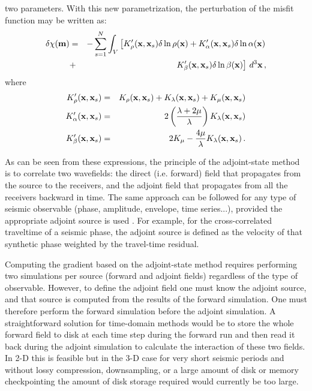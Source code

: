 two parameters. With this new parametrization, the perturbation of the misfit function may be written as:
\begin{eqnarray}
\delta\chi(\mathbf{m}) & = & - \sum_{s=1}^N\nonumber \int_V \left[ K'_\rho(\mathbf{x},\mathbf{x}_s)\delta\ln\rho(\mathbf{x})
+K'_\alpha(\mathbf{x},\mathbf{x}_s)\delta\ln\alpha(\mathbf{x}) \right. \nonumber \\
& + & \left. K'_\beta(\mathbf{x},\mathbf{x}_s)\delta\ln\beta(\mathbf{x})\right] \, d^3\mathbf{x} \, ,
\end{eqnarray}
where
\begin{eqnarray}
K'_\rho(\mathbf{x},\mathbf{x}_s) & = &  K_\rho(\mathbf{x},\mathbf{x}_s)+K_\lambda(\mathbf{x},\mathbf{x}_s)+K_\mu(\mathbf{x},\mathbf{x}_s) \\
K'_\alpha(\mathbf{x},\mathbf{x}_s) & = &  2 \left(\frac{\lambda+2\mu}{\lambda}\right) K_\lambda(\mathbf{x},\mathbf{x}_s) \\
K'_\beta(\mathbf{x},\mathbf{x}_s) & = & 2 K_\mu -\frac{4\mu}{\lambda} K_\lambda (\mathbf{x},\mathbf{x}_s) \, .
\end{eqnarray}

As can be seen from these expressions, the principle of the adjoint-state method is to correlate two wavefields:
the direct (i.e. forward) field that propagates from the source to the receivers, and the adjoint field that propagates from all the
receivers backward in time. The same approach can be followed for any type of seismic observable (phase, amplitude,
envelope, time series...), provided the appropriate adjoint source is used \cite[]{TrTaLi05,TrKoLi08}.
For example, for the cross-correlated traveltime of a seismic
phase, the adjoint source is defined as the velocity of that synthetic phase weighted by the travel-time residual.

Computing the gradient based on the adjoint-state method requires performing two simulations per source (forward and adjoint
fields) regardless of the type of observable. However, to define the adjoint field one
must know the adjoint source, and that source is computed from the results of the forward simulation. One must therefore perform
the forward simulation before the adjoint simulation.
A straightforward solution for time-domain methods would be to store the whole forward field to disk at
each time step during the forward run and then read it back during the adjoint simulation to calculate the interaction of these two fields.
In 2-D this is feasible but in the 3-D case for very short seismic periods and without lossy compression, downsampling,
or a large amount of disk or memory checkpointing \cite[e.g.,][]{FiKeIg09,RuHaPuGu14,CyShWi15}
the amount of disk storage required would currently be too large.

